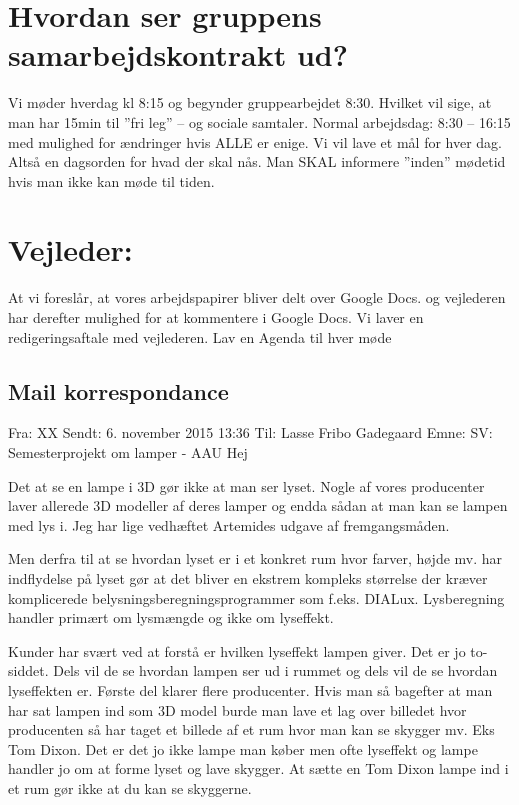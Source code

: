 \documentclass[oneside,a4paper,titlepage]{article}
\begin{document}
\section*{Hvordan ser gruppens samarbejdskontrakt ud?}
Vi møder hverdag kl 8:15 og begynder gruppearbejdet 8:30. Hvilket vil sige, at man har 15min til ”fri leg” – og sociale samtaler.
Normal arbejdsdag: 8:30 – 16:15 med mulighed for ændringer hvis ALLE er enige.
Vi vil lave et mål for hver dag. Altså en dagsorden for hvad der skal nås.
Man SKAL informere ”inden” mødetid hvis man ikke kan møde til tiden.
\section*{Vejleder:}
At vi foreslår, at vores arbejdspapirer bliver delt over Google Docs. og vejlederen har derefter mulighed for at kommentere i Google Docs. Vi laver en redigeringsaftale med vejlederen.
Lav en Agenda til hver møde
\clearpage
\subsection{Mail korrespondance}
Fra: XX \newline
Sendt: 6. november 2015 13:36 \newline
Til: Lasse Fribo Gadegaard\newline
Emne: SV: Semesterprojekt om lamper - AAU\newline
Hej
 
Det at se en lampe i 3D gør ikke at man ser lyset. Nogle af vores producenter laver allerede 3D modeller af deres lamper og endda sådan at man kan se lampen med lys i. Jeg har lige vedhæftet Artemides udgave af fremgangsmåden.

Men derfra til at se hvordan lyset er i et konkret rum hvor farver, højde mv. har indflydelse på lyset gør at det bliver en ekstrem kompleks størrelse der kræver komplicerede belysningsberegningsprogrammer som f.eks. DIALux. Lysberegning handler primært om lysmængde og ikke om lyseffekt.

Kunder har svært ved at forstå er hvilken lyseffekt lampen giver. Det er jo to-siddet. Dels vil de se hvordan lampen ser ud i rummet og dels vil de se hvordan lyseffekten er. Første del klarer flere producenter. Hvis man så bagefter at man har sat lampen ind som 3D model burde man lave et lag over billedet hvor producenten så har taget et billede af et rum hvor man kan se skygger mv. Eks Tom Dixon. Det er det jo ikke lampe man køber men ofte lyseffekt og lampe handler jo om at forme lyset og lave skygger. At sætte en Tom Dixon lampe ind i et rum gør ikke at du kan se skyggerne.
\end{document}
